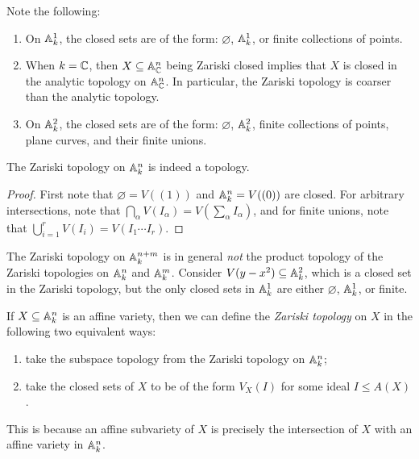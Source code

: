\begin{remark}
  Note the following:
  \begin{enumerate}
    \item On $\mathbb{A}_k^1$, the closed
      sets are of the form: $\varnothing$,
      $\mathbb{A}_k^1$, or finite collections
      of points.
    \item When $k = \mathbb{C}$, then
      $X \subseteq \mathbb{A}_{\mathbb{C}}^n$ being
      Zariski closed implies that
      $X$ is closed in the analytic
      topology on $\mathbb{A}_{\mathbb{C}}^n$.
      In particular, the Zariski topology
      is coarser than the analytic topology.
    \item On $\mathbb{A}_k^2$, the closed
      sets are of the form:
      $\varnothing$, $\mathbb{A}_k^2$,
      finite collections of points, plane
      curves, and their finite unions.
  \end{enumerate}
\end{remark}

\begin{prop}
  The Zariski topology on $\mathbb{A}_k^n$
  is indeed a topology.
\end{prop}

\begin{proof}
  First note that $\varnothing = V((1))$ and
  $\mathbb{A}_k^n = V((0))$ are closed.
  For arbitrary intersections, note
  that $\bigcap_\alpha V(I_\alpha) = V(\sum_\alpha I_\alpha)$, and
  for finite unions, note that
  $\bigcup_{i = 1}^r V(I_i) = V(I_1 \cdots I_r)$.
\end{proof}

\begin{example}
  The Zariski topology on
  $\mathbb{A}_k^{n + m}$ is in general
  \emph{not} the product topology
  of the Zariski topologies on
  $\mathbb{A}_k^n$ and $\mathbb{A}_k^m$.
  Consider $V(y - x^2) \subseteq \mathbb{A}_k^2$,
  which is a closed set in the Zariski
  topology, but the only closed
  sets in $\mathbb{A}_k^1$ are either
  $\varnothing$, $\mathbb{A}_k^1$,
  or finite.
\end{example}

\begin{definition}
  If $X \subseteq \mathbb{A}_k^n$ is
  an affine variety, then we can define the
  \emph{Zariski topology} on $X$ in
  the following two equivalent ways:
  \begin{enumerate}
    \item take the subspace topology
      from the Zariski topology on
      $\mathbb{A}_k^n$;
    \item take the closed
      sets of $X$ to be of the form
      $V_X(I)$ for some ideal $I \le A(X)$.
  \end{enumerate}
  This is because an affine subvariety
  of $X$ is precisely the
  intersection of $X$ with an affine
  variety in $\mathbb{A}_k^n$.
\end{definition}

